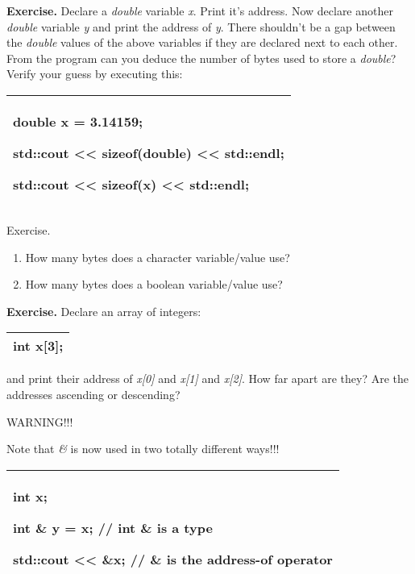 \documentclass[
]{article}
\providecommand{\tightlist}{%
  \setlength{\itemsep}{0pt}\setlength{\parskip}{0pt}}
\begin{document}
\textbf{Exercise.} Declare a \emph{double} variable \emph{x}. Print it's
address. Now declare another \emph{double} variable \emph{y} and print
the address of \emph{y}. There shouldn't be a gap between the
\emph{double} values of the above variables if they are declared next to
each other. From the program can you deduce the number of bytes used to
store a \emph{double}? Verify your guess by executing this:

\begin{longtable}[]{@{}l@{}}
\toprule
\endhead
\begin{minipage}[t]{0.97\columnwidth}\raggedright
double x = 3.14159;

std::cout \textless\textless{} sizeof(double) \textless\textless{}
std::endl;

std::cout \textless\textless{} sizeof(x) \textless\textless{}
std::endl;\strut
\end{minipage}\tabularnewline
\bottomrule
\end{longtable}

Exercise.

\begin{enumerate}
\def\labelenumi{(\alph{enumi})}
\tightlist
\item
  How many bytes does a character variable/value use?
\item
  How many bytes does a boolean variable/value use?
\end{enumerate}

\textbf{Exercise.} Declare an array of integers:

\begin{longtable}[]{@{}l@{}}
\toprule
\endhead
int x{[}3{]};\tabularnewline
\bottomrule
\end{longtable}

and print their address of \emph{x{[}0{]}} and \emph{x{[}1{]}} and
\emph{x{[}2{]}}. How far apart are they? Are the addresses ascending or
descending?

WARNING!!!

Note that \emph{\&} is now used in two totally different ways!!!

\begin{longtable}[]{@{}l@{}}
\toprule
\endhead
\begin{minipage}[t]{0.97\columnwidth}\raggedright
int x;

int \& y = x; // int \& is a type

std::cout \textless\textless{} \&x; // \& is the address-of
operator\strut
\end{minipage}\tabularnewline
\bottomrule
\end{longtable}
\end{document}
